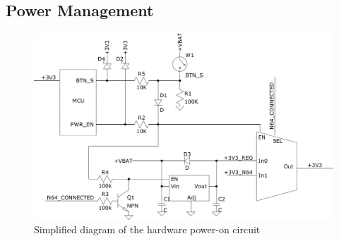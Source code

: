 \subsection{Power Management}

\begin{figure}
	\centering
	\includegraphics[width=.9\linewidth]{images/hw-power-on.pdf}
	\caption{Simplified diagram of the hardware power-on circuit}
	\label{fig:hw:pm:power-on}
\end{figure}


